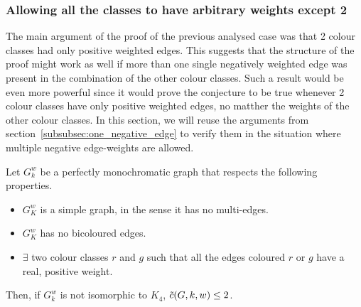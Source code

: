 \subsubsection{Allowing all the classes to have arbitrary weights except 2}
\label{subsubsec:2_pos_classes}

The main argument of the proof of the previous analysed case was that 2 colour classes had only positive weighted edges.
This suggests that the structure of the proof might work as well if more than one single negatively weighted edge was present in the combination of the other colour classes.
Such a result would be even more powerful since it would prove the conjecture to be true whenever 2 colour classes have only positive weighted edges, no matther the weights of the other colour classes.
In this section, we will reuse the arguments from section~\ref{subsubsec:one_negative_edge} to verify them in the situation where multiple negative edge-weights are allowed.


\begin{lemma}
    \label{lem:2_positive_colour_classes_forbidden}
    Let $G_k^w$ be a perfectly monochromatic graph that respects the following properties.
    \begin{itemize}
        \item $G_K^w$ is a simple graph, in the sense it has no multi-edges.
        \item $G_K^w$ has no bicoloured edges.
        \item $\exists$ two colour classes $r$ and $g$ such that all the edges coloured $r$ or $g$ have a real, positive weight.
    \end{itemize}
    Then, if $G_k^w$ is not isomorphic to $K_4$, $\Tilde{c}(G, k, w) \leq 2$.
\end{lemma}

